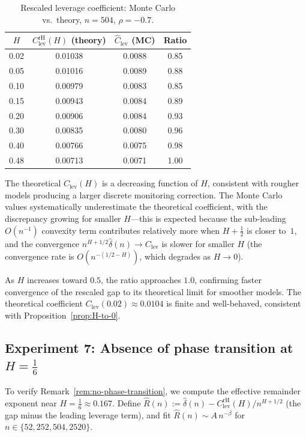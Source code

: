 \documentclass[12pt]{article}
\theoremstyle{definition}
\begin{document}
\begin{table}[htbp]
\centering
\caption{Rescaled leverage coefficient: Monte Carlo vs.\ theory,
$n = 504$, $\rho = -0.7$.}
\label{tab:boundary-H}
\begin{tabular}{cccc}
\toprule
$H$ & $C_{\mathrm{lev}}^{\mathrm{rH}}(H)$ (theory)
& $\hat C_{\mathrm{lev}}$ (MC) & Ratio \\
\midrule
0.02 & 0.01038 & 0.0088 & 0.85 \\
0.05 & 0.01016 & 0.0089 & 0.88 \\
0.10 & 0.00979 & 0.0083 & 0.85 \\
0.15 & 0.00943 & 0.0084 & 0.89 \\
0.20 & 0.00906 & 0.0084 & 0.93 \\
0.30 & 0.00835 & 0.0080 & 0.96 \\
0.40 & 0.00766 & 0.0075 & 0.98 \\
0.48 & 0.00713 & 0.0071 & 1.00 \\
\bottomrule
\end{tabular}
\end{table}

The theoretical $C_{\mathrm{lev}}(H)$ is a decreasing function of $H$,
consistent with rougher models producing a larger discrete monitoring
correction.
The Monte Carlo values systematically underestimate the theoretical
coefficient, with the discrepancy growing for smaller $H$---this is
expected because the sub-leading $O(n^{-1})$ convexity term contributes
relatively more when $H + \tfrac12$ is closer to~$1$, and the
convergence $n^{H+1/2}\hat\delta(n) \to C_{\mathrm{lev}}$ is slower
for smaller $H$ (the convergence rate is $O(n^{-(1/2-H)})$,
which degrades as $H \to 0$).

As $H$ increases toward $0.5$, the ratio approaches $1.0$,
confirming faster convergence of the rescaled gap to its theoretical
limit for smoother models.
The theoretical coefficient $C_{\mathrm{lev}}(0.02) \approx 0.0104$
is finite and well-behaved, consistent with
Proposition~\ref{prop:H-to-0}.

\subsection{Experiment 7: Absence of phase transition at
$H = \tfrac16$}\label{sec:exp7}

To verify Remark~\ref{rem:no-phase-transition}, we compute the
effective remainder exponent near $H = \tfrac16 \approx 0.167$.
Define $\hat R(n) := \hat\delta(n) -
C_{\mathrm{lev}}^{\mathrm{rH}}(H)/n^{H+1/2}$
(the gap minus the leading leverage term), and fit
$\hat R(n) \sim A\,n^{-\beta}$ for $n \in \{52, 252, 504, 2520\}$.
\end{document}
